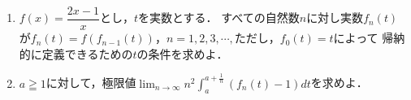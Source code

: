 \documentclass[../../main.tex]{subfiles}
\begin{document}
\begin{enumerate}
  \item $\displaystyle f(x)=\dfrac{2x-1}{x}$とし，$t$を実数とする．
    すべての自然数$n$に対し実数$f_n(t)$が$f_n(t)=f(f_{n-1}(t))$，$n=1,2,3,\cdots,$ただし，$f_0(t)=t$によって
    帰納的に定義できるための$t$の条件を求めよ．
  \item $a \geqq 1$に対して，極限値$\displaystyle \lim_{n \to \infty}n^2\int_a^{a+\frac{1}{n}}(f_n(t)-1)dt$を求めよ．
\end{enumerate}
\end{document}
